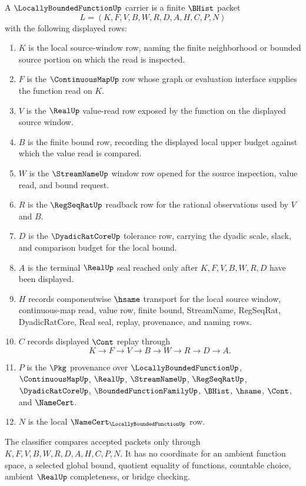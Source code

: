 \begin{definition}
\label{def:locally-bounded-function-carrier}
A $\LocallyBoundedFunctionUp$ carrier is a finite $\BHist$ packet
$$
L=(K,F,V,B,W,R,D,A,H,C,P,N)
$$
with the following displayed rows:
\begin{enumerate}
\item $K$ is the local source-window row, naming the finite neighborhood or bounded source portion on which the read is inspected.
\item $F$ is the $\ContinuousMapUp$ row whose graph or evaluation interface supplies the function read on $K$.
\item $V$ is the $\RealUp$ value-read row exposed by the function on the displayed source window.
\item $B$ is the finite bound row, recording the displayed local upper budget against which the value read is compared.
\item $W$ is the $\StreamNameUp$ window row opened for the source inspection, value read, and bound request.
\item $R$ is the $\RegSeqRatUp$ readback row for the rational observations used by $V$ and $B$.
\item $D$ is the $\DyadicRatCoreUp$ tolerance row, carrying the dyadic scale, slack, and comparison budget for the local bound.
\item $A$ is the terminal $\RealUp$ seal reached only after $K,F,V,B,W,R,D$ have been displayed.
\item $H$ records componentwise $\hsame$ transport for the local source window, continuous-map read, value row, finite bound, StreamName, RegSeqRat, DyadicRatCore, Real seal, replay, provenance, and naming rows.
\item $C$ records displayed $\Cont$ replay through
$$
K\longrightarrow F\longrightarrow V\longrightarrow B\longrightarrow W\longrightarrow R\longrightarrow D\longrightarrow A .
$$
\item $P$ is the $\Pkg$ provenance over $\LocallyBoundedFunctionUp$, $\ContinuousMapUp$, $\RealUp$, $\StreamNameUp$, $\RegSeqRatUp$, $\DyadicRatCoreUp$, $\BoundedFunctionFamilyUp$, $\BHist$, $\hsame$, $\Cont$, and $\NameCert$.
\item $N$ is the local $\NameCert_{\LocallyBoundedFunctionUp}$ row.
\end{enumerate}
The classifier compares accepted packets only through $K,F,V,B,W,R,D,A,H,C,P,N$. It has no coordinate for an ambient function space, a selected global bound, quotient equality of functions, countable choice, ambient $\RealUp$ completeness, or bridge checking.
\end{definition}

